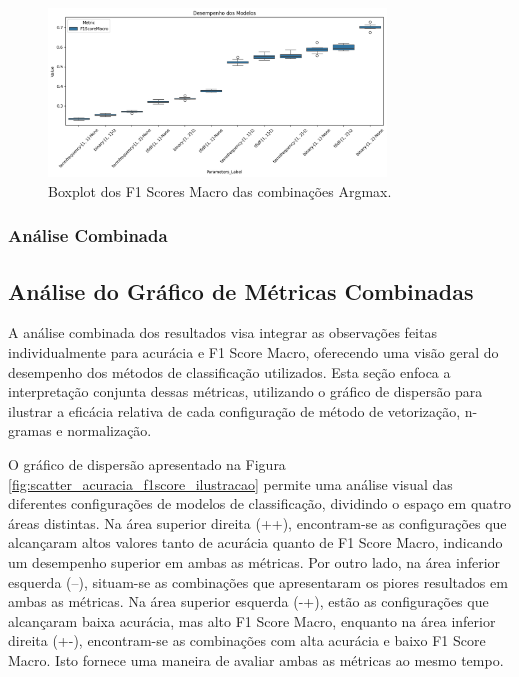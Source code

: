 \begin{figure}[H]
    \centering
    \includegraphics[width=0.8\textwidth]{images/ArgmaxF1ScoreTodos.png}
    \caption{Boxplot dos F1 Scores Macro das combinações Argmax.}
    \label{fig:boxplot_f1score}
\end{figure}

\subsubsection{Análise Combinada}

\subsection{Análise do Gráfico de Métricas Combinadas}

A análise combinada dos resultados visa integrar as observações feitas individualmente para acurácia e F1 Score Macro, oferecendo uma visão geral do desempenho dos métodos de classificação utilizados. Esta seção enfoca a interpretação conjunta dessas métricas, utilizando o gráfico de dispersão para ilustrar a eficácia relativa de cada configuração de método de vetorização, n-gramas e normalização.

O gráfico de dispersão apresentado na Figura \ref{fig:scatter_acuracia_f1score_ilustracao} permite uma análise visual das diferentes configurações de modelos de classificação, dividindo o espaço em quatro áreas distintas. Na área superior direita (++), encontram-se as configurações que alcançaram altos valores tanto de acurácia quanto de F1 Score Macro, indicando um desempenho superior em ambas as métricas. Por outro lado, na área inferior esquerda (--), situam-se as combinações que apresentaram os piores resultados em ambas as métricas. Na área superior esquerda (-+), estão as configurações que alcançaram baixa acurácia, mas alto F1 Score Macro, enquanto na área inferior direita (+-), encontram-se as combinações com alta acurácia e baixo F1 Score Macro. Isto fornece uma maneira de avaliar ambas as métricas ao mesmo tempo.


